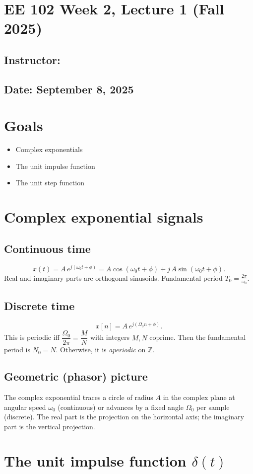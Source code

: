 \documentclass{ee102_notes}
\renewcommand{\releasedate}{September 8, 2025}
\begin{document}
\section*{EE 102 Week 2, Lecture 1 (Fall 2025)}
\subsection*{Instructor: \instructor}
\subsection*{Date: \releasedate}
\section{Goals}
\begin{itemize}
    \item Complex exponentials
    \item The unit impulse function
    \item The unit step function
\end{itemize}
\section{Complex exponential signals}
\subsection*{Continuous time}
\[
x(t)=A\,e^{j(\omega_0 t+\phi)}=A\cos(\omega_0 t+\phi)+j\,A\sin(\omega_0 t+\phi).
\]
Real and imaginary parts are orthogonal sinusoids. Fundamental period $T_0=\frac{2\pi}{\omega_0}$.

\subsection*{Discrete time}
\[
x[n]=A\,e^{j(\Omega_0 n+\phi)}.
\]
This is periodic iff $\dfrac{\Omega_0}{2\pi}=\dfrac{M}{N}$ with integers $M,N$ coprime. Then the fundamental period is $N_0=N$. Otherwise, it is \emph{aperiodic} on $\mathbb{Z}$.

\subsection*{Geometric (phasor) picture}
The complex exponential traces a circle of radius $A$ in the complex plane at angular speed $\omega_0$ (continuous) or advances by a fixed angle $\Omega_0$ per sample (discrete). The real part is the projection on the horizontal axis; the imaginary part is the vertical projection.
\section{The unit impulse function $\delta(t)$}
\end{document}

